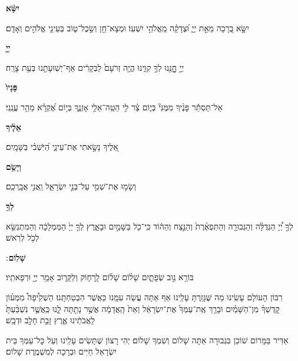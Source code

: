 \documentclass[twoside, openany, parskip=half, 11pt]{book}
\begin{document}
\textbf{יִשָּׂ֨א}
\hfill \begin{footnotesize}
יִשָּׂ֣א בְ֭רָכָה מֵאֵ֣ת יְיָ֑ וּ֝צְדָקָ֗ה מֵֽאֱלֹהֵ֥י יִשְׁעֽוֹ׃ וּמְצָא־חֵ֖ן וְשֵׂ֣כֶל־ט֑וֹב בְּעֵינֵ֖י אֱלֹהִ֣ים וְאָדָֽם׃\\
\end{footnotesize}
\textbf{יְיָ֤}
\hfill \begin{footnotesize}
יְיָ֥ חׇׇׇׇנֵּ֖נוּ לְךָ֣ קִוִּ֑ינוּ הֱיֵ֤ה זְרֹעָם֙ לַבְּקָרִ֔ים אַף־יְשֽׁוּעָתֵ֖נוּ בְּעֵ֥ת צָרָֽה׃\\
\end{footnotesize}
\textbf{פָּנָיו֙}
\hfill \begin{footnotesize}
אַל־תַּסְתֵּ֬ר פָּנֶ֨יךָ מִמֶּנִּי֘ בְּי֢וֹם צַ֫ר לִ֥י הַטֵּֽה־אֵלַ֥י אָזְנֶ֑ךָ
בְּי֥וֹם אֶ֝קְרָ֗א מַהֵ֥ר עֲנֵֽנִי׃\\
\end{footnotesize}
\textbf{אֵלֶ֔יךָ}
\hfill \begin{footnotesize}
אֵ֭לֶיךָ נָשָׂ֣אתִי אֶת־עֵינַ֑י הַ֝יֹּֽשְׁבִ֗י בַּשָּׁמָֽיִם׃\\
\end{footnotesize}
\textbf{וְיָשֵׂ֥ם}
\hfill \begin{footnotesize}
וְשָׂמ֥וּ אֶת־שְׁמִ֖י עַל־בְּנֵ֣י יִשְׂרָאֵ֑ל וַֽאֲנִ֖י אֲבָֽרְכֵֽם׃\\
\end{footnotesize}
\textbf{לְךָ֖}
\hfill \begin{footnotesize}
לְךָ֣ יְ֠יָ הַגְּדֻלָּ֨ה וְהַגְּבוּרָ֤ה וְהַתִּפְאֶ֨רֶת֙ וְהַנֵּ֣צַח וְהַה֔וֹד
כִּֽי־כֹ֖ל בַּשָּׁמַ֣יִם וּבָאָ֑רֶץ לְךָ֤ יְיָ֙ הַמַּמְלָכָ֔ה וְהַמִּתְנַשֵּׂ֖א
לְכֹ֥ל לְרֹֽאשׁ׃\\
\end{footnotesize}
\textbf{שָׁלֽוֹם}
׃ \hfill \begin{footnotesize}
בּוֹרֵ֖א נִ֣וב שְׂפָתָ֑יִם שָׁל֨וֹם שָׁל֜וֹם לָֽרָח֧וֹק וְלַקָּר֛וֹב
אָמַ֥ר יְיָ֖ וּרְפָאתִֽיו׃
\end{footnotesize}

\clearpage

\begin{paracol}{2}
רִבּוֹן הָעוֹלָם עָשִֽׂינוּ מַה שֶּׁגָּזַֽרְתָּ עָלֵֽינוּ אַף אַתָּה עֲשֵׂה עִמָּֽנוּ כַּאֲשֶׁר הִבְטַחְתָּֽנוּ׃ הַשְׁקִ֩יפָה֩ מִמְּע֨וֹן קׇדְשְׁךָ֜ מִן־הַשָּׁמַ֗יִם וּבָרֵ֤ךְ אֶֽת־עַמְּךָ֙ אֶת־יִשְׂרָאֵ֔ל וְאֵת֙ הָֽאֲדָמָ֔ה אֲשֶׁ֥ר נָתַ֖תָּה לָ֑נוּ כַּֽאֲשֶׁ֤ר נִשְׁבַּ֨עְתָּ֙ לַֽאֲבֹתֵ֔ינוּ אֶ֛רֶץ זָבַ֥ת חָלָ֖ב וּדְבָֽשׁ׃

\switchcolumn

\kahal
אַדִּיר בַּמָּרוֹם שׁוֹכֵן בִּגְבוּרָה אַתָּה שָׁלוֹם וְשִׁמְךָ שָׁלוֹם׃ יְהִי רָצוֹן שֶׁתָּשִׂים עָלֵֽינוּ וְעַל כׇּל־עַמְּךָ בֵּית יִשְׂרָאֵל חַיִּים וּבְרָכָה לְמִשְׁמֶֽרֶת שָׁלוֹם׃
\end{paracol}
\end{document}
